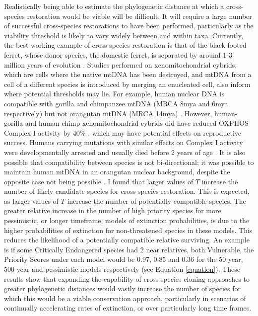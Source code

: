 \documentclass[12pt]{article}
\begin{document}
	Realistically being able to estimate the phylogenetic distance at which
	a cross-species restoration would be viable will be difficult. It will
	require a large number of successful cross-species restorations to
	have been performed, particularly as the viability threshold
	is likely to vary widely
	between and within taxa. Currently, the best working example of cross-species
	restoration is that of the black-footed ferret, whose donor species, the
	domestic ferret, is separated by around 1-3 million years of evolution
	\citep{frittsConservationFirstCloned2022}. Studies performed on xenomitochondrial
	cybrids, which are cells where the native mtDNA has
	been destroyed, and mtDNA from a cell of a different species is introduced
	by merging an enucleated cell, also inform where potential thresholds
	may lie.
	For example, human nuclear DNA
	is compatible with gorilla and chimpanzee mtDNA (MRCA 8mya and 6mya respectively)
	but not orangutan mtDNA (MRCA 14mya)
	\citep{kenyonExpandingFunctionalHuman1997}. However, human-gorilla and
	human-chimp xenomitochondrial cybrids did have reduced
	OXPHOS Complex I activity by 40\%
	\citep{barrientosHumanXenomitochondrialCybrids1998}, which may have potential effects on reproductive success. Humans carrying mutations with similar effects on Complex
	I activity were developmentally arrested and usually died before 2 years of
	age \citep{gershoniMitochondrialBioenergeticsMajor2009}. It is also possible
	that compatibility between species is not bi-directional; it was possible to
	maintain human mtDNA in an orangutan nuclear background, despite the opposite
	case not being possible \citep{bayona-bafaluyFastAdaptiveCoevolution2005}. I
	found that
	larger values of $T$ increase the number of likely candidate species
	for cross-species restoration. This is
	expected, as larger values of $T$ increase the number of potentially
	compatible species. The greater relative increase in the number of high priority
	species for more pessimistic, or longer timeframe, models of extinction
	probabilities, is due to the higher probabilities of extinction for non-threatened
	species in these models. This reduces the likelihood of a potentially
	compatible relative surviving.
	An example is if some Critically Endangered species had 2 near relatives,
	both Vulnerable, the Priority Scores
	under each model would be 0.97, 0.85 and 0.36 for the 50 year, 500 year and
	pessimistic models respectively (see Equation \ref{equation}). These results
	show that expanding
	the capability of cross-species cloning approaches to greater phylogenetic
	distances would vastly increase the number of species for which this would be
	a viable conservation approach, particularly in scenarios of continually
	accelerating rates of extinction, or over particularly long time frames. 
	
\end{document}
